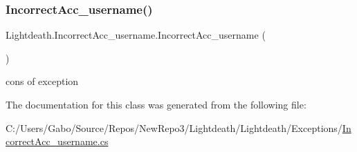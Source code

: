 \subsubsection{\texorpdfstring{Incorrect\+Acc\+\_\+username()}{IncorrectAcc\_username()}}
{\footnotesize\ttfamily Lightdeath.\+Incorrect\+Acc\+\_\+username.\+Incorrect\+Acc\+\_\+username (\begin{DoxyParamCaption}{ }\end{DoxyParamCaption})\hspace{0.3cm}{\ttfamily [inline]}}



cons of exception 



The documentation for this class was generated from the following file\+:\begin{DoxyCompactItemize}
\item 
C\+:/\+Users/\+Gabo/\+Source/\+Repos/\+New\+Repo3/\+Lightdeath/\+Lightdeath/\+Exceptions/\hyperlink{_incorrect_acc__username_8cs}{Incorrect\+Acc\+\_\+username.\+cs}\end{DoxyCompactItemize}
